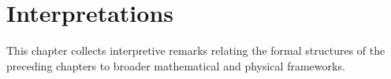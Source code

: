 \chapter{Interpretations}
\label{chap:interpretations}

This chapter collects interpretive remarks relating the formal structures of
the preceding chapters to broader mathematical and physical frameworks.

